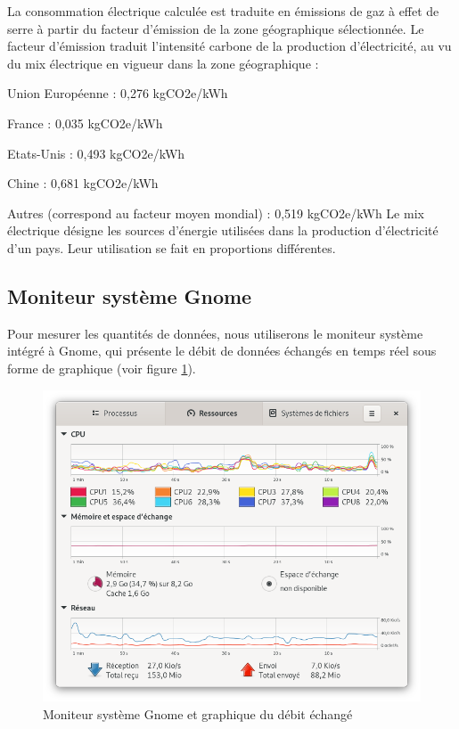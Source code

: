 \documentclass[11pt,a4paper]{report}
\begin{document}
La consommation électrique calculée est traduite en émissions de gaz à effet de serre à partir du facteur d’émission de la zone géographique sélectionnée. Le facteur d’émission traduit l’intensité carbone de la production d’électricité, au vu du mix électrique en vigueur dans la zone géographique :
\bi \item Union Européenne : 0,276 kgCO2e/kWh
\item France : 0,035 kgCO2e/kWh
\item Etats-Unis : 0,493 kgCO2e/kWh
\item Chine : 0,681 kgCO2e/kWh
\item Autres (correspond au facteur moyen mondial) : 0,519 kgCO2e/kWh \ei
{} Le mix électrique désigne les sources d’énergie utilisées dans la production d’électricité d’un pays. Leur utilisation se fait en proportions différentes. \eb

\subsection{Moniteur système Gnome}
Pour mesurer les quantités de données, nous utiliserons le moniteur système intégré à Gnome, qui présente le débit de données échangés en temps réel sous forme de graphique (voir figure \ref{fig:gnome}).

\begin{figure}[!h]
    \centering
    \includegraphics[scale=0.3]{capture_moniteur_sys.png}
    \caption{Moniteur système Gnome et graphique du débit échangé}
     \label{fig:gnome}
\end{figure}
\end{document}
